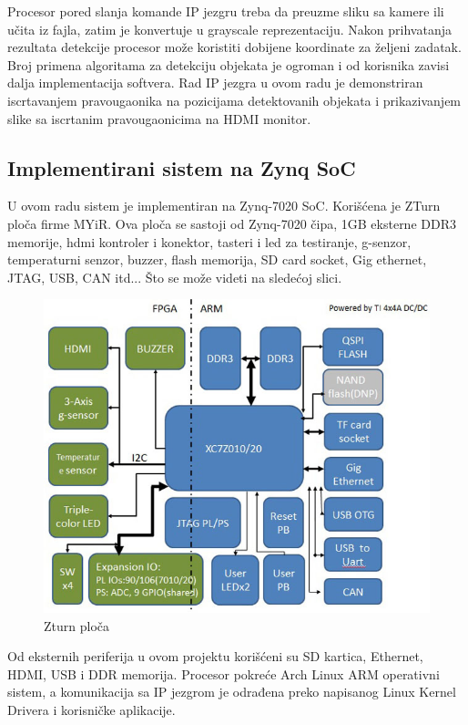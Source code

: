 Procesor pored slanja komande IP jezgru treba da preuzme sliku sa kamere ili
učita iz fajla, zatim je konvertuje u grayscale reprezentaciju.
Nakon prihvatanja rezultata detekcije procesor može koristiti dobijene
koordinate za željeni zadatak. \\
Broj primena algoritama za detekciju objekata je ogroman i od korisnika zavisi
dalja implementacija softvera.
Rad IP jezgra u ovom radu je demonstriran iscrtavanjem pravougaonika na
pozicijama detektovanih objekata i prikazivanjem slike sa iscrtanim
pravougaonicima na HDMI monitor. \\

\newpage

\subsection{Implementirani sistem na Zynq SoC}

U ovom radu sistem je implementiran na Zynq-7020 SoC.
Korišćena je ZTurn\cite{zturn} ploča firme MYiR.
Ova ploča se sastoji od Zynq-7020 čipa, 1GB eksterne DDR3 memorije, \gls{hdmi}
kontroler i konektor, tasteri i \gls{led} za testiranje, g-senzor, temperaturni
senzor, buzzer, flash memorija, SD card socket, Gig ethernet, JTAG, USB, CAN itd...
Što se može videti na sledećoj slici. \\

\begin{figure}[H]
  \centering
  \includegraphics[width=0.65\linewidth]{images/zturn.jpg}
  \caption{Zturn ploča\cite{zturn}}
  \label{zturn_bd}
\end{figure}



Od eksternih periferija u ovom projektu korišćeni su SD kartica, Ethernet, HDMI,
USB i DDR memorija.
Procesor pokreće Arch Linux ARM\cite{arch} operativni sistem, a komunikacija sa IP jezgrom je
odrađena preko napisanog Linux Kernel Drivera i korisničke aplikacije. \\

